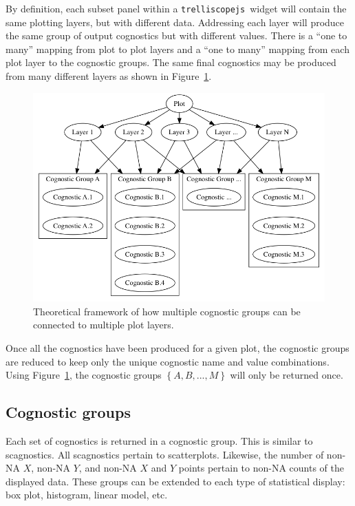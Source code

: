 \documentclass[stat,dissertation]{puthesis}\usepackage[]{graphicx}\usepackage{xcolor}
\newcommand{\pkg}[1]{\texttt{#1}}
\newcommand{\trelliscopejs}{\pkg{trelliscopejs}}
\begin{document}
By definition, each subset panel within a \trelliscopejs~widget will contain the same plotting layers, but with different data.  Addressing each layer will produce the same group of output cognostics but with different values.  There is a ``one to many'' mapping from plot to plot layers and a ``one to many'' mapping from each plot layer to the cognostic groups.  The same final cognostics may be produced from many different layers as shown in Figure~\ref{fig:cog_fig_layer}.

\begin{figure}[H]
  \label{fig:cog_fig_layer}
  \includegraphics[width = \textwidth ]{./dot/plot_layers.png}
  \caption{Theoretical framework of how multiple cognostic groups can be connected to multiple plot layers.}
\end{figure}

Once all the cognostics have been produced for a given plot, the cognostic groups are reduced to keep only the unique cognostic name and value combinations.  Using Figure~\ref{fig:cog_fig_layer}, the cognostic groups $\left\{A, B, ..., M\right\}$ will only be returned once.











\subsection{Cognostic groups}

Each set of cognostics is returned in a cognostic group.  This is similar to scagnostics.  All scagnostics pertain to scatterplots.  Likewise, the number of non-NA $X$, non-NA $Y$, and non-NA $X$ and $Y$ points pertain to non-NA counts of the displayed data.  These groups can be extended to each type of statistical display: box plot, histogram, linear model, etc.
\end{document}

